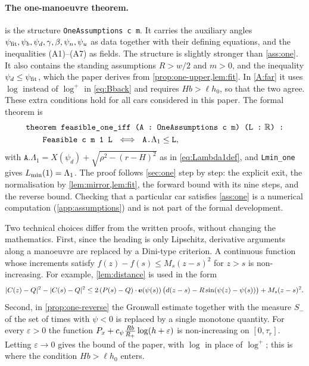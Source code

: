 \paragraph{The one-manoeuvre theorem.}
 is the structure \texttt{OneAssumptions c m}.
It carries the auxiliary angles $\psi_{\rm fit},\psi_b,\psi_d,\gamma,\beta,\psi_n,\psi_u$ as data together with their defining equations, and the inequalities (A1)--(A7) as fields.
The structure is slightly stronger than \cref{ass:one}.
It also contains the standing assumptions $R>w/2$ and $m>0$, and the inequality $\psi_d\le\psi_{\rm fit}$, which the paper derives from \cref{prop:one-upper,lem:fit}.
In \ref{A:far} it uses $\log$ instead of $\log^+$ in \eqref{eq:Bback} and requires $Hb>\ell h_0$, so that the two agree.
These extra conditions hold for all cars considered in this paper.
The formal theorem is
\begin{align*}
  &\texttt{theorem feasible\_one\_iff (A : OneAssumptions c m) (L :}\ \R\texttt{) :}\\
  &\qquad\texttt{Feasible c m 1 L}\ \iff\ \texttt{A.}\Lambda_1\le\texttt{L},
\end{align*}
with $\texttt{A.}\Lambda_1=X(\psi_d)+\sqrt{\rho^2-(r-H)^2}$ as in \eqref{eq:Lambda1def}, and \texttt{Lmin\_one} gives $L_{\min}(1)=\Lambda_1$.
The proof follows \cref{sec:one} step by step: the explicit exit, the normalisation by \cref{lem:mirror,lem:fit}, the forward bound with its nine steps, and the reverse bound.
Checking that a particular car satisfies \cref{ass:one} is a numerical computation (\cref{app:assumptions}) and is not part of the formal development.

Two technical choices differ from the written proofs, without changing the mathematics.
First, since the heading is only Lipschitz, derivative arguments along a manoeuvre are replaced by a Dini-type criterion.
A continuous function whose increments satisfy $f(z)-f(s)\le M_s(z-s)^2$ for $z>s$ is non-increasing.
For example, \cref{lem:distance} is used in the form
\[
  |C(z)-Q|^2-|C(s)-Q|^2\le 2\,(P(s)-Q)\cdot\mathbf{e}(\psi(s))\,\big(d(z-s)-R\sin(\psi(z)-\psi(s))\big)+M_s(z-s)^2 .
\]
Second, in \cref{prop:one-reverse} the Gronwall estimate together with the measure $S_-$ of the set of times with $\psi<0$ is replaced by a single monotone quantity.
For every $\varepsilon>0$ the function $P_x+c_\psi\frac{Rb}{R_{+}}\log(h+\varepsilon)$ is non-increasing on $[0,\tau_r]$.
Letting $\varepsilon\to0$ gives the bound of the paper, with $\log$ in place of $\log^+$; this is where the condition $Hb>\ell h_0$ enters.

